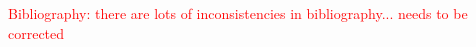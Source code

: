 \documentclass[conference]{IEEEtran}
\begin{document}
\textcolor{red}{Bibliography: there are lots of inconsistencies in bibliography... needs to be corrected}

\printbibliography










%
%



%
%
\end{document}
